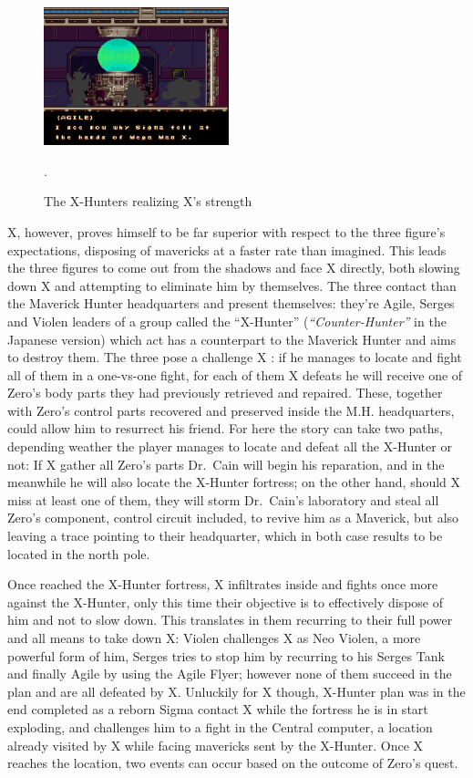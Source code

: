 \begin{figure}[htp]
	\centering
	\includegraphics[height=4cm]{figures/X2/story_2.jpg}
	\caption {The X-Hunters realizing X's strength}.
\end{figure}
X, however, proves himself to be far superior with respect to the three figure's expectations, disposing of mavericks at a faster rate than imagined. This leads the three figures to come out from the shadows and face X directly, both slowing down X and attempting to eliminate him by themselves. The three contact than the Maverick Hunter headquarters and present themselves: they're Agile, Serges and Violen leaders of a group called the ``X-Hunter'' (\textit{``Counter-Hunter''} in the Japanese version) which act has a counterpart to the Maverick Hunter and aims to destroy them. The three pose a challenge X : if he manages to locate and fight all of them in a one-vs-one fight, for each of them X defeats he will receive one of Zero's body parts they had previously retrieved and repaired. These, together with Zero's control parts recovered and preserved inside the M.H. headquarters, could allow him to resurrect his friend. For here the story can take two paths, depending weather the player manages to locate and defeat all the X-Hunter or not:
If X gather all Zero's parts Dr.~Cain will begin his reparation, and in the meanwhile he will also locate the X-Hunter fortress; on the other hand, should X miss at least one of them, they will storm Dr.~Cain's laboratory and steal all Zero's component, control circuit included, to revive him as a Maverick, but also leaving a trace pointing to their headquarter, which in both case results to be located in the north pole.

Once reached the X-Hunter fortress, X infiltrates inside and fights once more against the X-Hunter, only this time their objective is to effectively dispose of him and not to slow down. This translates in them recurring to their full power and all means to take down X: Violen challenges X as Neo Violen, a more powerful form of him, Serges tries to stop him by recurring to his Serges Tank and finally Agile by using the Agile Flyer; however none of them succeed in the plan and are all defeated by X. Unluckily for X though, X-Hunter plan was in the end completed as a reborn Sigma contact X while the fortress he is in start exploding, and challenges him to a fight in the Central computer, a location already visited by X while facing mavericks sent by the X-Hunter. Once X reaches the location, two events can occur based on the outcome of Zero's quest.

